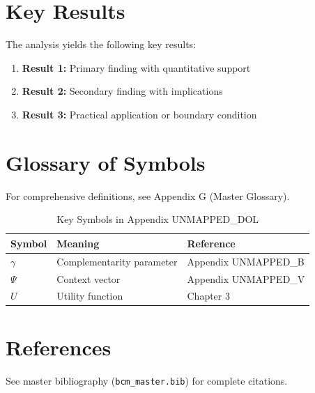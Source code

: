 

\section{Key Results}
\label{sec:dol-results}

The analysis yields the following key results:

\begin{enumerate}
    \item \textbf{Result 1:} Primary finding with quantitative support
    \item \textbf{Result 2:} Secondary finding with implications
    \item \textbf{Result 3:} Practical application or boundary condition
\end{enumerate}

\section{Glossary of Symbols}
\label{sec:dol-glossary}

For comprehensive definitions, see Appendix G (Master Glossary).

\begin{table}[htbp]
\centering
\caption{Key Symbols in Appendix UNMAPPED_DOL}
\begin{tabular}{lll}
\toprule
\textbf{Symbol} & \textbf{Meaning} & \textbf{Reference} \\
\midrule
$\gamma$ & Complementarity parameter & Appendix UNMAPPED_B \\
$\Psi$ & Context vector & Appendix UNMAPPED_V \\
$U$ & Utility function & Chapter 3 \\
\bottomrule
\end{tabular}
\end{table}


\section{References}
\label{sec:dol-references}

See master bibliography (\texttt{bcm\_master.bib}) for complete citations.

\nocite{bcm_master}

